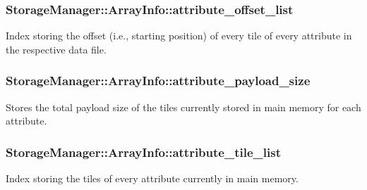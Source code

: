 \subsubsection[{attribute\+\_\+offset\+\_\+list}]{ Storage\+Manager\+::\+Array\+Info\+::attribute\+\_\+offset\+\_\+list\hspace{0.3cm}{\ttfamily [private]}}\label{classStorageManager_1_1ArrayInfo_a3c8572cbfe484d51eaad76691df35307}
Index storing the offset (i.\+e., starting position) of every tile of every attribute in the respective data file. \hypertarget{classStorageManager_1_1ArrayInfo_ac5bab01a9632352ec518a9fa8ee227f2}{}
\subsubsection[{attribute\+\_\+payload\+\_\+size}]{ Storage\+Manager\+::\+Array\+Info\+::attribute\+\_\+payload\+\_\+size\hspace{0.3cm}{\ttfamily [private]}}\label{classStorageManager_1_1ArrayInfo_ac5bab01a9632352ec518a9fa8ee227f2}
Stores the total payload size of the tiles currently stored in main memory for each attribute. \hypertarget{classStorageManager_1_1ArrayInfo_a7591c9d182ecf561c93b85fff806b841}{}
\subsubsection[{attribute\+\_\+tile\+\_\+list}]{ Storage\+Manager\+::\+Array\+Info\+::attribute\+\_\+tile\+\_\+list\hspace{0.3cm}{\ttfamily [private]}}\label{classStorageManager_1_1ArrayInfo_a7591c9d182ecf561c93b85fff806b841}
Index storing the tiles of every attribute currently in main memory. \hypertarget{classStorageManager_1_1ArrayInfo_a2ade6b75055a6bfcf8bbfb11ca7e3cfc}{}
